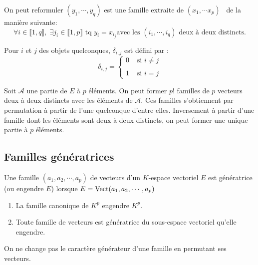 \begin{rem}
  On peut reformuler \og $(y_1,\cdots,y_q)$ est une famille extraite de $(x_1,\cdots x_p)$\fg~ de la manière suivante:
\begin{displaymath}
\forall i\in \llbracket1,q \rrbracket, \; \exists j_i\in \llbracket 1,p \rrbracket \text{ tq } y_i = x_{i_j}
\text{avec les $(i_1, \cdots ,i_q)$ deux à deux distincts.}
\end{displaymath}
\end{rem}

\begin{defi} Pour $i$ et $j$ des objets quelconques, $\delta_{i,j}$ est défini par :
 \begin{displaymath}
  \delta_{i,j}=\left\lbrace 
\begin{aligned}
 0 &\text{ si } i\neq j \\ \\
 1 &\text{ si } i= j
\end{aligned}
\right.  
 \end{displaymath}
\end{defi}
\begin{rem}
 Soit $\mathcal A$ une partie de $E$ à $p$ éléments. On peut former $p!$ familles de $p$ vecteurs deux à deux distincts avec les éléments de $\mathcal A$. Ces familles s'obtiennent par permutation à partir de l'une quelconque d'entre elles. Inversement à partir d'une famille dont les éléments sont deux à deux distincts, on peut former une unique partie à $p$ éléments.
\end{rem}

\subsection{Familles génératrices}
\begin{defi}
 Une famille $(a_1,a_2,\cdots,a_p)$ de vecteurs d'un $K$-espace vectoriel $E$ est génératrice (ou engendre $E$) lorsque  $E = \mathop{\mathrm{Vect}}(a_1,a_2,\cdots,a_p)$
\end{defi}
\begin{exples}
 \begin{enumerate}
 \item La famille canonique de $K^p$ engendre $K^p$.
\item Toute famille de vecteurs est génératrice du sous-espace vectoriel qu'elle engendre.
\end{enumerate}
\end{exples}
\begin{propn}
 On ne change pas le caractère générateur d'une famille en permutant ses vecteurs.
\end{propn}


